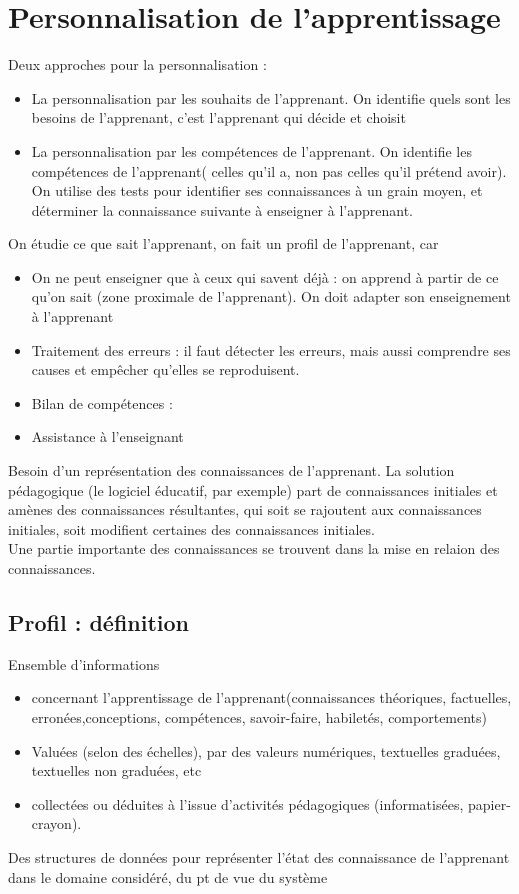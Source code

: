 \begin{itemize}
\end{itemize}

\vskip 4cm

\section{Personnalisation de l'apprentissage}

Deux approches pour la personnalisation :
\begin{itemize}
	\item La personnalisation par les souhaits de l'apprenant. On identifie quels sont les besoins de l'apprenant, c'est l'apprenant qui décide et choisit
	\item La personnalisation par les compétences de l'apprenant. On identifie les compétences de l'apprenant( celles qu'il a, non pas celles qu'il prétend avoir). On utilise des tests pour identifier ses connaissances à un grain moyen, et déterminer la connaissance suivante à enseigner à l'apprenant.
\end{itemize}


\vskip 1cm
On étudie ce que sait l'apprenant, on fait un profil de l'apprenant, car
\begin{itemize}
	\item On ne peut enseigner que à ceux qui savent déjà : on apprend à partir de ce qu'on sait (zone proximale de l'apprenant). On doit adapter son enseignement à l'apprenant
	\item Traitement des erreurs : il faut détecter les erreurs, mais aussi comprendre ses causes et empêcher qu'elles se reproduisent.
	\item Bilan de compétences :
	\item Assistance à l'enseignant
\end{itemize}

Besoin d'un représentation des connaissances de l'apprenant.
La solution pédagogique (le logiciel éducatif, par exemple) part de connaissances initiales et amènes des connaissances résultantes, qui soit se rajoutent aux connaissances initiales, soit modifient certaines des connaissances initiales.\\
Une partie importante des connaissances se trouvent dans la mise en relaion des connaissances.


\subsection{Profil : définition}
Ensemble d'informations
\begin{itemize}
	\item concernant l'apprentissage de l'apprenant(connaissances théoriques, factuelles, erronées,conceptions,  compétences, savoir-faire, habiletés, comportements)
	\item Valuées (selon des échelles), par des valeurs numériques, textuelles graduées, textuelles non graduées, etc
	\item collectées ou déduites à l'issue d'activités pédagogiques (informatisées, papier-crayon). 
\end{itemize}
Des structures de données pour représenter l'état des connaissance de l'apprenant dans le domaine considéré, du pt de vue du système

